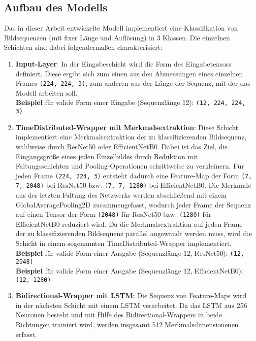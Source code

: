 \documentclass{article}
\newcommand{\imgsize}{\texttt{(224, 224, 3)}\xspace}
\newcommand{\resnet}{ResNet50\xspace}
\newcommand{\effnet}{EfficientNetB0\xspace}
\begin{document}
    \subsection{Aufbau des Modells}
    Das in dieser Arbeit entwickelte Modell implementiert eine Klassifikation von Bildsequenzen (mit fixer Länge und Auflösung) in 3 Klassen.
    Die einzelnen Schichten sind dabei folgendermaßen charakterisiert:
    \begin{enumerate}
        \item\textbf{Input-Layer}:
            In der Eingabeschicht wird die Form des Eingabetensors definiert.
            Diese ergibt sich zum einen aus den Abmessungen eines einzelnen Frames \imgsize, zum anderen aus der Länge der Sequenz, mit der das Modell arbeiten soll.
            \\\textbf{Beispiel} für valide Form einer Eingabe (Sequenzlänge 12): \texttt{(12, 224, 224, 3)}
        \item\textbf{TimeDistributed-Wrapper mit Merkmalsextraktion}:
            Diese Schicht implementiert eine Merkmalsextraktion der zu klassifizierenden Bildsequenz, wahlweise durch \resnet oder \effnet.
            Dabei ist das Ziel, die Eingangsgröße eines jeden Einzelbildes durch Reduktion mit Faltungsschichten und Pooling-Operationen schrittweise zu verkleinern.
            Für jeden Frame \imgsize entsteht dadurch eine Feature-Map der Form \texttt{(7, 7, 2048)} bei \resnet bzw. \texttt{(7, 7, 1280)} bei \effnet.
            Die Merkmale aus der letzten Faltung des Netzwerks werden abschließend mit einem GlobalAveragePooling2D zusammengefasst, wodurch jeder Frame der Sequenz auf einen Tensor der Form \texttt{(2048)} für \resnet bzw. \texttt{(1280)} für \effnet reduziert wird.
            Da die Merkmalsextraktion auf jeden Frame der zu klassifizierenden Bildsequenz parallel angewandt werden muss, wird die Schicht in einem sogenannten TimeDistributed-Wrapper implementiert.
            \\\textbf{Beispiel} für valide Form einer Ausgabe (Sequenzlänge 12, \resnet): \texttt{(12, 2048)}
            \\\textbf{Beispiel} für valide Form einer Ausgabe (Sequenzlänge 12, \effnet): \texttt{(12, 1280)}
        \item\textbf{Bidirectional-Wrapper mit LSTM}:
            Die Sequenz von Feature-Maps wird in der nächsten Schicht mit einem LSTM verarbeitet.
            Da das LSTM aus 256 Neuronen besteht und mit Hilfe des Bidirectional-Wrappers in beide Richtungen trainiert wird, werden insgesamt 512 Merkmalsdimensionenen erfasst.

\end{enumerate}
\end{document}
